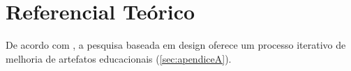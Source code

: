 \section{Referencial Teórico}\label{sec:referencialTeorico}

De acordo com \cite{pimentelDesignScienceResearch2020}, a pesquisa baseada em
design oferece um processo iterativo de melhoria de artefatos educacionais
(\ref{sec:apendiceA}).
